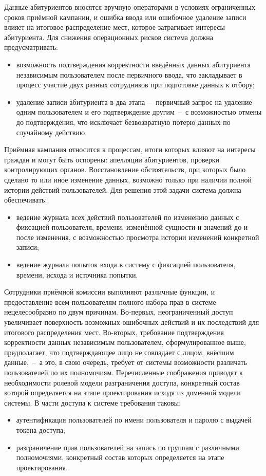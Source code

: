 Данные абитуриентов вносятся вручную операторами в условиях ограниченных сроков приёмной кампании, и ошибка ввода или ошибочное удаление записи влияет на итоговое распределение мест, которое затрагивает интересы абитуриента.
Для снижения операционных рисков система должна предусматривать:
\begin{itemize}
\item возможность подтверждения корректности введённых данных абитуриента независимым пользователем после первичного ввода, что закладывает в процесс участие двух разных сотрудников при подготовке данных к отбору;
\item удаление записи абитуриента в два этапа~--~первичный запрос на удаление одним пользователем и его подтверждение другим~--~с возможностью отмены до подтверждения, что исключает безвозвратную потерю данных по случайному действию.
\end{itemize}

Приёмная кампания относится к процессам, итоги которых влияют на интересы граждан и могут быть оспорены: апелляции абитуриентов, проверки контролирующих органов.
Восстановление обстоятельств, при которых было сделано то или иное изменение данных, возможно только при наличии полной истории действий пользователей.
Для решения этой задачи система должна обеспечивать:
\begin{itemize}
\item ведение журнала всех действий пользователей по изменению данных с фиксацией пользователя, времени, изменённой сущности и значений до и после изменения, с возможностью просмотра истории изменений конкретной записи;
\item ведение журнала попыток входа в систему с фиксацией пользователя, времени, исхода и источника попытки.
\end{itemize}

Сотрудники приёмной комиссии выполняют различные функции, и предоставление всем пользователям полного набора прав в системе нецелесообразно по двум причинам.
Во-первых, неограниченный доступ увеличивает поверхность возможных ошибочных действий и их последствий для итогового распределения мест.
Во-вторых, требование подтверждения корректности данных независимым пользователем, сформулированное выше, предполагает, что подтверждающее лицо не совпадает с лицом, внёсшим данные,~--~а это, в свою очередь, требует от системы возможности различать пользователей по их полномочиям.
Перечисленные соображения приводят к необходимости ролевой модели разграничения доступа, конкретный состав которой определяется на этапе проектирования исходя из доменной модели системы.
В части доступа к системе требования таковы:
\begin{itemize}
\item аутентификация пользователей по имени пользователя и паролю с выдачей токена доступа;
\item разграничение прав пользователей на запись по группам с различными полномочиями, конкретный состав которых определяется на этапе проектирования.
\end{itemize}

